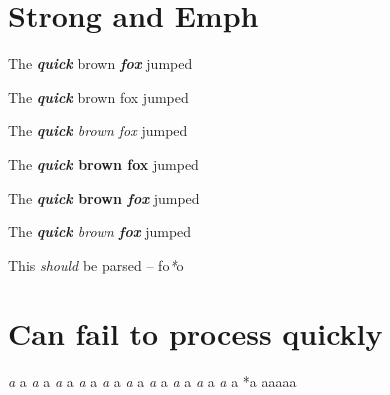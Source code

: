 
\def\mytitle{Edge Cases}


\part{Strong and Emph}
\label{strongandemph}

The \textbf{\emph{quick}} brown \textbf{\emph{fox}} jumped

The \textbf{\emph{quick}} brown fox jumped

The \emph{\textbf{quick} brown fox} jumped

The \textbf{\emph{quick} brown fox} jumped

The \textbf{\emph{quick} brown \emph{fox}} jumped

The \emph{\textbf{quick} brown \textbf{fox}} jumped

This \emph{should} be parsed -- fo\emph{*}o

\part{Can fail to process quickly}
\label{canfailtoprocessquickly}

\emph{a
}a
\emph{a
}a
\emph{a
}a
\emph{a
}a
\emph{a
}a
\emph{a
}a
\emph{a
}a
\emph{a
}a
\emph{a
}a
\emph{a
}a
*a
aaaaa




